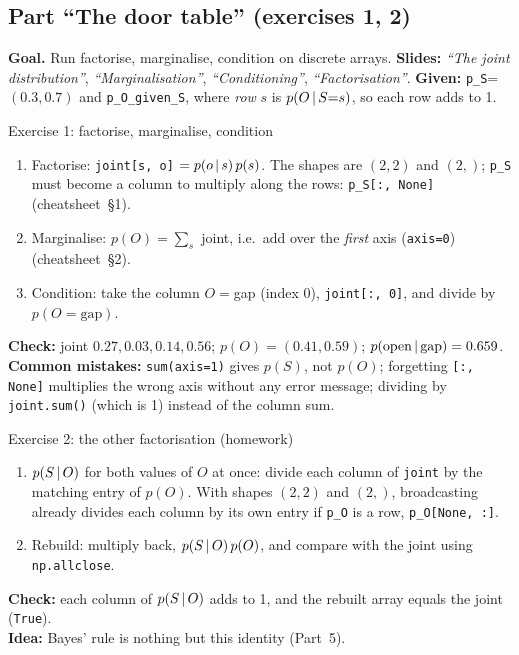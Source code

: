 \documentclass[11pt]{article}
\newcommand{\slide}[1]{\textit{``#1''}}
\newcommand{\cs}[1]{cheatsheet~\S#1}
\begin{document}
\subsection*{Part ``The door table'' (exercises 1, 2)}
\textbf{Goal.} Run factorise, marginalise, condition on discrete arrays. \textbf{Slides:} \slide{The joint distribution}, \slide{Marginalisation}, \slide{Conditioning}, \slide{Factorisation}. \textbf{Given:} \texttt{p\_S}=$(0.3,0.7)$ and \texttt{p\_O\_given\_S}, where \emph{row} $s$ is $p(O\,|\, S{=}s)$, so each row adds to 1.

\begin{labhelp}{Exercise 1: factorise, marginalise, condition}
\begin{enumerate}[nosep]
\item Factorise: \texttt{joint[s, o]} $=p(o\,|\, s)\,p(s)$. The shapes are $(2,2)$ and $(2,)$; \texttt{p\_S} must become a column to multiply along the rows: \texttt{p\_S[:, None]} (\cs{1}).
\item Marginalise: $p(O)=\sum_s$ joint, i.e.\ add over the \emph{first} axis (\texttt{axis=0}) (\cs{2}).
\item Condition: take the column $O=$gap (index 0), \texttt{joint[:, 0]}, and divide by $p(O{=}\text{gap})$.
\end{enumerate}
\textbf{Check:} joint $0.27,0.03,0.14,0.56$; $p(O)=(0.41,0.59)$; $p(\text{open}\,|\,\text{gap})=0.659$.\\
\textbf{Common mistakes:} \texttt{sum(axis=1)} gives $p(S)$, not $p(O)$; forgetting \texttt{[:, None]} multiplies the wrong axis without any error message; dividing by \texttt{joint.sum()} (which is 1) instead of the column sum.
\end{labhelp}

\begin{labhelp}{Exercise 2: the other factorisation (homework)}
\begin{enumerate}[nosep]
\item $p(S\,|\, O)$ for both values of $O$ at once: divide each column of \texttt{joint} by the matching entry of $p(O)$. With shapes $(2,2)$ and $(2,)$, broadcasting already divides each column by its own entry if \texttt{p\_O} is a row, \texttt{p\_O[None, :]}.
\item Rebuild: multiply back, $p(S\,|\, O)\,p(O)$, and compare with the joint using \texttt{np.allclose}.
\end{enumerate}
\textbf{Check:} each column of $p(S\,|\, O)$ adds to 1, and the rebuilt array equals the joint (\texttt{True}).\\
\textbf{Idea:} Bayes' rule is nothing but this identity (Part~5).
\end{labhelp}
\end{document}
